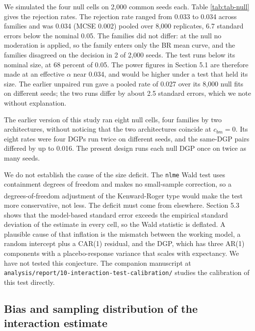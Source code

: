 \documentclass[
  11pt,
]{article}
\begin{document}
We simulated the four null cells on
2,000
common seeds each. Table \ref{tab:tab-null} gives the rejection
rates.
The rejection rate ranged from 0.033 to 0.034 across families and was 0.034 (MCSE 0.002) pooled over 8,000 replicates, 6.7 standard errors below the nominal 0.05. The families did not differ: at the null no moderation is applied, so the family enters only the BR mean curve, and the families disagreed on the decision in 2 of 2,000 seeds.
The test runs below its nominal size, at
68
percent of 0.05. The power figures in Section 5.1 are therefore made
at an effective \(\alpha\) near
0.034, and
would be higher under a test that held its size. The earlier unpaired
run gave a pooled rate of
0.027
over its 8,000 null fits on different seeds; the two runs differ by
about 2.5
standard errors, which we note without explanation.

The earlier version of this study ran eight null cells, four families
by two architectures, without noticing that the two architectures
coincide at \(c_{bm} = 0\). Its eight rates were four DGPs run twice on
different seeds, and the same-DGP pairs differed by up to 0.016. The
present design runs each null DGP once on twice as many seeds.

We do not establish the cause of the size deficit. The \texttt{nlme} Wald
test uses containment degrees of freedom and makes no small-sample
correction, so a degrees-of-freedom adjustment of the Kenward-Roger
type\textsuperscript{} would make the test more conservative, not
less. The deficit must come from elsewhere. Section 5.3 shows that the
model-based standard error exceeds the empirical standard deviation of
the estimate in every cell, so the Wald statistic is deflated. A
plausible cause of that inflation is the mismatch between the working
model, a random intercept plus a CAR(1) residual, and the DGP, which
has three AR(1) components with a placebo-response variance that
scales with expectancy. We have not tested this conjecture. The companion manuscript at
\texttt{analysis/report/10-interaction-test-calibration/} studies the
calibration of this test directly.

\subsection{Bias and sampling distribution of the interaction estimate}\label{bias-and-sampling-distribution-of-the-interaction-estimate}
\end{document}
